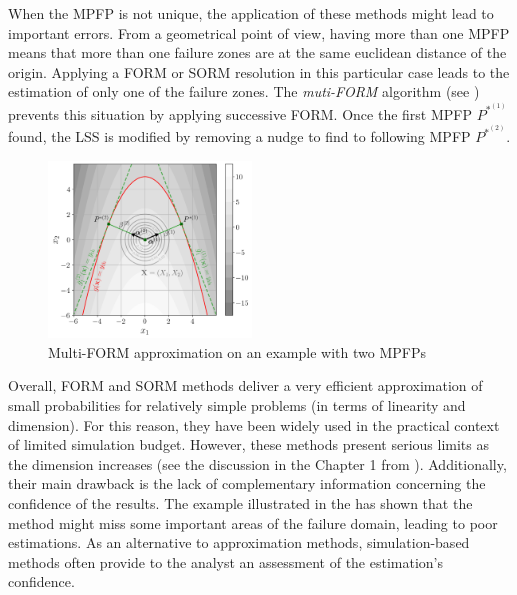 When the MPFP is not unique, the application of these methods might lead to important errors.
From a geometrical point of view, having more than one MPFP means that more than one failure zones are at the same euclidean distance of the origin.
Applying a FORM or SORM resolution in this particular case leads to the estimation of only one of the failure zones.
The \textit{muti-FORM} algorithm (see \citet{derkiureghian_1998}) prevents this situation by applying successive FORM. 
Once the first MPFP $P^{*^{(1)}}$ found, the LSS is modified by removing a nudge to find to following MPFP $P^{*^{(2)}}$. 

\begin{figure}[ht]
    \centering
    \includegraphics[width=0.48\textwidth]{../numerical_experiments/chapter1/figures/reliability_multiform.png}
    \caption{Multi-FORM approximation on an example with two MPFPs}
    \label{fig:multi_FORM}
\end{figure}


Overall, FORM and SORM methods deliver a very efficient approximation of small probabilities for relatively simple problems (in terms of linearity and dimension). 
For this reason, they have been widely used in the practical context of limited simulation budget. 
However, these methods present serious limits as the dimension increases (see the discussion in the Chapter 1 from \citet{chabridon_2018_thesis}). 
Additionally, their main drawback is the lack of complementary information concerning the confidence of the results. 
The example illustrated in the  has shown that the method might miss some important areas of the failure domain, leading to poor estimations. 
As an alternative to approximation methods, simulation-based methods often provide to the analyst an assessment of the estimation's confidence. 




